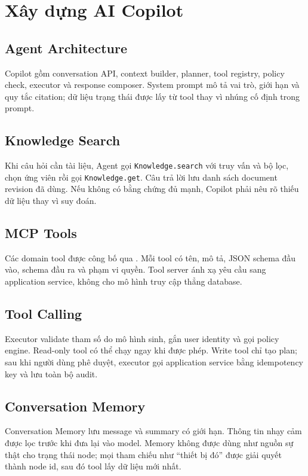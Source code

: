 \section{Xây dựng AI Copilot}

\subsection{Agent Architecture}

Copilot gồm conversation API, context builder, planner, tool registry, policy
check, executor và response composer. System prompt mô tả vai trò, giới hạn và
quy tắc citation; dữ liệu trạng thái được lấy từ tool thay vì nhúng cố định trong
prompt.

\subsection{Knowledge Search}

Khi câu hỏi cần tài liệu, Agent gọi \texttt{Knowledge.search} với truy vấn và bộ
lọc, chọn ứng viên rồi gọi \texttt{Knowledge.get}. Câu trả lời lưu danh sách
document revision đã dùng. Nếu không có bằng chứng đủ mạnh, Copilot phải nêu rõ
thiếu dữ liệu thay vì suy đoán.

\subsection{MCP Tools}

Các domain tool được công bố qua .
Mỗi tool có tên, mô tả, JSON schema đầu vào, schema đầu ra và phạm vi quyền. Tool
server ánh xạ yêu cầu sang application service, không cho mô hình truy cập thẳng
database.

\subsection{Tool Calling}

Executor validate tham số do mô hình sinh, gắn user identity và gọi policy engine.
Read-only tool có thể chạy ngay khi được phép. Write tool chỉ tạo plan; sau khi
người dùng phê duyệt, executor gọi application service bằng idempotency key và
lưu toàn bộ audit.

\subsection{Conversation Memory}

Conversation Memory lưu message và summary có giới hạn. Thông tin nhạy cảm được
lọc trước khi đưa lại vào model. Memory không được dùng như nguồn sự thật cho
trạng thái node; mọi tham chiếu như ``thiết bị đó'' được giải quyết thành node id,
sau đó tool lấy dữ liệu mới nhất.